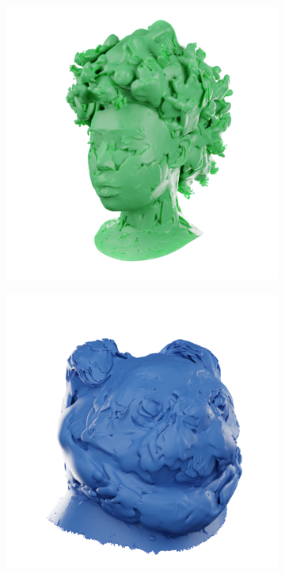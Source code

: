\begin{figure}[tb]
  \centering
  \begin{subfigure}{0.19\linewidth}
  \includegraphics[width=\linewidth]{images/meshes/khady_sugar.png}
  \end{subfigure}
  \hfill
  \begin{subfigure}{0.19\linewidth}
  \includegraphics[width=\linewidth]{images/meshes/pug_sugar.png}

\end{subfigure}
\end{figure}
